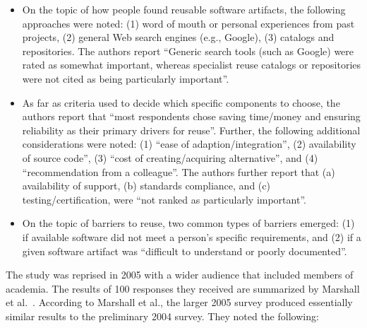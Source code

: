 \documentclass{casicswhitepaper}
\begin{document}
\begin{itemize}

\item On the topic of how people found reusable software artifacts, the following approaches were noted: (1) word of mouth or personal experiences from past projects, (2) general Web search engines (e.g., Google), (3) catalogs and repositories.  The authors report ``Generic search tools (such as Google) were rated as somewhat important, whereas specialist reuse catalogs or repositories were not cited as being particularly important''.

\item As far as criteria used to decide which specific components to choose, the authors report that ``most respondents chose saving time/money and ensuring reliability as their primary drivers for reuse''.  Further, the following additional considerations were noted: (1) ``ease of adaption/integration'', (2) availability of source code'', (3) ``cost of creating/acquiring alternative'', and (4) ``recommendation from a colleague''.  The authors further report that (a) availability of support, (b) standards compliance, and (c) testing/certification, were ``not ranked as particularly important''.

\item On the topic of barriers to reuse, two common types of barriers emerged: (1) if available software did not meet a person's specific requirements, and (2) if a given software artifact was ``difficult to understand or poorly documented''.

\end{itemize}

The study was reprised in 2005 with a wider audience that included members of academia.  The results of 100 responses they received are summarized by Marshall et al.~\cite{marshall2006software}.  According to Marshall et al., the larger 2005 survey produced essentially similar results to the preliminary 2004 survey.  They noted the following:
\end{document}
